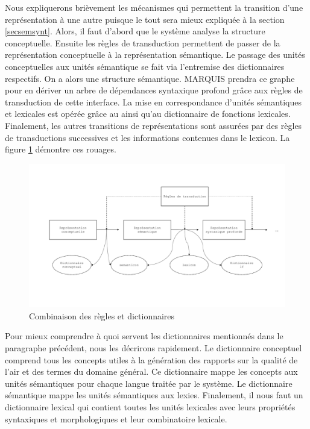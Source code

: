 Nous expliquerons brièvement les mécanismes qui permettent la transition d'une représentation à une autre puisque le tout sera mieux expliquée à la section \ref{secsemsynt}. Alors, il faut d'abord que le système analyse la structure conceptuelle. Ensuite les règles de transduction permettent de passer de la représentation conceptuelle à la représentation sémantique. Le passage des unités conceptuelles aux unités sémantique se fait via l'entremise des dictionnaires respectifs. On a alors une structure sémantique. MARQUIS prendra ce graphe pour en dériver un arbre de dépendances syntaxique profond grâce aux règles de transduction de cette interface. La mise en correspondance d'unités sémantiques et lexicales est opérée grâce au  ainsi qu'au dictionnaire de fonctions lexicales. Finalement, les autres transitions de représentations sont assurées par des règles de transductions successives et les informations contenues dans le lexicon. La figure \ref{fig:reglesdict} démontre ces rouages.
\begin{figure}[htb]
	\centering
	\includegraphics[width=1\textwidth, trim = {0cm 0cm 0cm 0cm},clip]{ch2/figs/module.pdf}
	\caption{Combinaison des règles et dictionnaires}
	\label{fig:reglesdict}
\end{figure}

Pour mieux comprendre à quoi servent les dictionnaires mentionnés dans le paragraphe précédent, nous les décrirons rapidement. Le dictionnaire conceptuel comprend tous les concepts utiles à la génération des rapports sur la qualité de l'air et des termes du domaine général. Ce dictionnaire mappe les concepts aux unités sémantiques pour chaque langue traitée par le système. Le dictionnaire sémantique mappe les unités sémantiques aux lexies. Finalement, il nous faut un dictionnaire lexical qui contient toutes les unités lexicales avec leurs propriétés syntaxiques et morphologiques et leur combinatoire lexicale.

